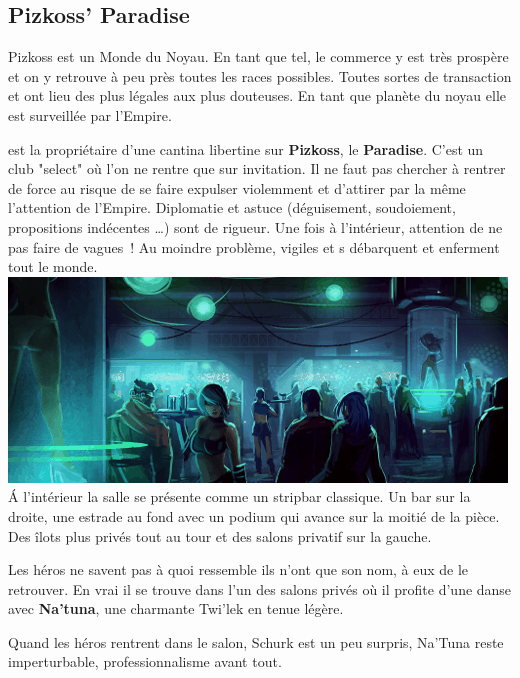 \newpage
\subsection{Pizkoss’ Paradise}
Pizkoss est un Monde du Noyau. En tant que tel, le commerce y est très prospère et on y retrouve à peu près toutes les races possibles. Toutes sortes de transaction et ont lieu des plus légales aux plus douteuses. En tant que planète du noyau elle est surveillée par l’Empire.

 est la propriétaire d’une cantina libertine sur \textbf{Pizkoss}, le \textbf{Paradise}. C’est un club "select" où l’on ne rentre que sur invitation. Il ne faut pas chercher à rentrer de force au risque de se faire expulser violemment et d’attirer par la même l’attention de l’Empire. Diplomatie et astuce (déguisement, soudoiement, propositions indécentes \ldots) sont de rigueur. Une fois à l’intérieur, attention de ne pas faire de vagues~! Au moindre problème, vigiles et s débarquent et enferment tout le monde.\\

\noindent\includegraphics[width=\linewidth]{_img/places/paradise-club.png}\\

\'A l’intérieur la salle se présente comme un stripbar classique. Un bar sur la droite, une estrade au fond avec un podium qui avance sur la moitié de la pièce. Des îlots plus privés tout au tour et des salons privatif sur la gauche. 

Les héros ne savent pas à quoi ressemble  ils n’ont que son nom, à eux de le retrouver. En vrai il se trouve dans l’un des salons privés où il profite d’une danse avec \textbf{Na’tuna}, une charmante Twi’lek en tenue légère.

Quand les héros rentrent dans le salon, Schurk est un peu surpris, Na’Tuna reste imperturbable, professionnalisme avant tout.

